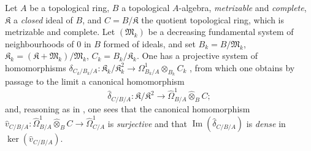 \begin{env}[20.7.20]
\label{0.20.7.20}
Let $A$ be a topological ring, $B$ a topological $A$-algebra, \emph{metrizable} and \emph{complete}, $\mathfrak{K}$ a \emph{closed} ideal of $B$, and $C=B/\mathfrak{K}$ the quotient topological ring, which is metrizable and complete. Let $(\mathfrak{M}_k)$ be a decreasing fundamental system of neighbourhoods of $0$ in $B$ formed of ideals, and set $B_k=B/\mathfrak{M}_k$, $\mathfrak{K}_k=(\mathfrak{K}+\mathfrak{M}_k)/\mathfrak{M}_k$, $C_k=B_k/\mathfrak{K}_k$. One has a projective system of homomorphisms $\delta_{C_k/B_k/A}:\mathfrak{K}_k/\mathfrak{K}_k^2\longrightarrow\Omega^1_{B_k/A}\otimes_{B_k}C_k$
, from which one obtains by passage to the limit a canonical homomorphism
\[
  \widehat{\delta}_{C/B/A}:\mathfrak{K}/\mathfrak{K}^2\longrightarrow
  \widehat{\Omega}^1_{B/A}\widehat{\otimes}_B C;
\]
and, reasoning as in , one sees that the canonical homomorphism $\widehat{v}_{C/B/A}:\widehat{\Omega}^1_{B/A}\widehat{\otimes}_B C\longrightarrow\widehat{\Omega}^1_{C/A}$
is \emph{surjective} and that $\operatorname{Im}(\widehat{\delta}_{C/B/A})$ is \emph{dense} in $\ker(\widehat{v}_{C/B/A})$.
\end{env}
